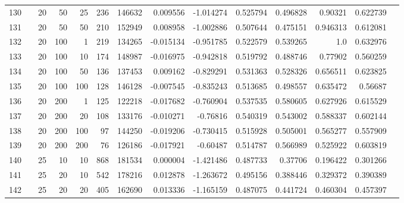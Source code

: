\begin{longtable}{llrrrrrrrrrrrr}
		130 & &           20 &                50 &           25 &         236 &     146632 &  0.009556 & -1.014274 &  0.525794 &    0.496828 &        0.90321 &  0.622739 \\
		131 & &           20 &                50 &           50 &         210 &     152949 &  0.008958 & -1.002886 &  0.507644 &    0.475151 &       0.946313 &  0.612081 \\
		132 & &           20 &               100 &            1 &         219 &     134265 & -0.015134 & -0.951785 &  0.522579 &    0.539265 &            1.0 &  0.632976 \\
		133 & &           20 &               100 &           10 &         174 &     148987 & -0.016975 & -0.942818 &  0.519792 &    0.488746 &        0.77902 &  0.560259 \\
		134 & &           20 &               100 &           50 &         136 &     137453 &  0.009162 & -0.829291 &  0.531363 &    0.528326 &       0.656511 &  0.623825 \\
		135 & &           20 &               100 &          100 &         128 &     146128 & -0.007545 & -0.835243 &  0.513685 &    0.498557 &       0.635472 &   0.56687 \\
		136 & &           20 &               200 &            1 &         125 &     122218 & -0.017682 & -0.760904 &  0.537535 &    0.580605 &       0.627926 &  0.615529 \\
		137 & &           20 &               200 &           20 &         108 &     133176 & -0.010271 &  -0.76816 &  0.540319 &    0.543002 &       0.588337 &  0.602144 \\
		138 & &           20 &               200 &          100 &          97 &     144250 & -0.019206 & -0.730415 &  0.515928 &    0.505001 &       0.565277 &  0.557909 \\
		139 & &           20 &               200 &          200 &          76 &     126186 & -0.017921 &  -0.60487 &  0.514787 &    0.566989 &       0.525922 &  0.603819 \\
		140 & &           25 &                10 &           10 &         868 &     181534 &  0.000004 & -1.421486 &  0.487733 &     0.37706 &       0.196422 &  0.301266 \\
		141 & &           25 &                20 &           10 &         542 &     178216 &  0.012878 & -1.263672 &  0.495156 &    0.388446 &       0.329372 &  0.390389 \\
		142 & &           25 &                20 &           20 &         405 &     162690 &  0.013336 & -1.165159 &  0.487075 &    0.441724 &       0.460304 &  0.457397 \\

\end{longtable}
